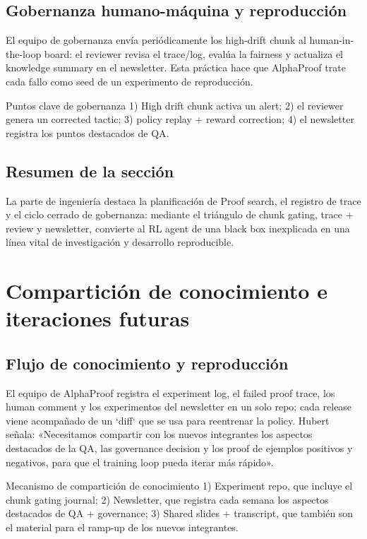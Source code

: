\documentclass[a4paper]{article}
\begin{document}
\subsection{Gobernanza humano-máquina y reproducción}
El equipo de gobernanza envía periódicamente los high-drift chunk al human-in-the-loop board: el reviewer revisa el trace/log, evalúa la fairness y actualiza el knowledge summary en el newsletter. Esta práctica hace que AlphaProof trate cada fallo como seed de un experimento de reproducción.
\begin{knowledgebox}{Puntos clave de gobernanza}
1) High drift chunk activa un alert; 2) el reviewer genera un corrected tactic; 3) policy replay + reward correction; 4) el newsletter registra los puntos destacados de QA.
\end{knowledgebox}

\subsection{Resumen de la sección}
La parte de ingeniería destaca la planificación de Proof search, el registro de trace y el ciclo cerrado de gobernanza: mediante el triángulo de chunk gating, trace + review y newsletter, convierte al RL agent de una black box inexplicada en una línea vital de investigación y desarrollo reproducible.
\newpage

\section{Compartición de conocimiento e iteraciones futuras}

\subsection{Flujo de conocimiento y reproducción}
El equipo de AlphaProof registra el experiment log, el failed proof trace, los human comment y los experimentos del newsletter en un solo repo; cada release viene acompañado de un `diff` que se usa para reentrenar la policy. Hubert señala: «Necesitamos compartir con los nuevos integrantes los aspectos destacados de la QA, las governance decision y los proof de ejemplos positivos y negativos, para que el training loop pueda iterar más rápido».
\begin{importantbox}{Mecanismo de compartición de conocimiento}
1) Experiment repo, que incluye el chunk gating journal; 2) Newsletter, que registra cada semana los aspectos destacados de QA + governance; 3) Shared slides + transcript, que también son el material para el ramp-up de los nuevos integrantes.
\end{importantbox}
\end{document}
